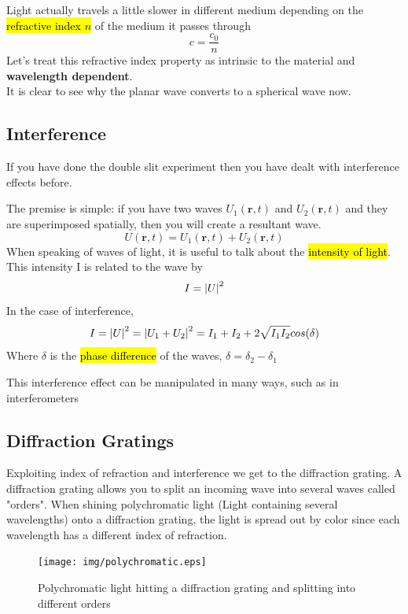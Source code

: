 \documentclass{article}
\begin{document}
Light actually travels a little slower in different medium depending on the \hl{refractive index $n$} of the medium it passes through
\begin{equation}
    c = \frac{c_0}{n}
\end{equation}
Let's treat this refractive index property as intrinsic to the material and \textbf{wavelength dependent}.
\\
It is clear to see why the planar wave converts to a spherical wave now.



\subsection{Interference}
If you have done the double slit experiment then you have dealt with interference effects before.

The premise is simple: if you have two waves $U_1(\textbf{r},t)$ and $U_2(\textbf{r},t)$ and they are superimposed spatially, then you will create a resultant wave.
\begin{equation}
    U(\textbf{r},t) = U_1(\textbf{r},t)+U_2(\textbf{r},t)
\end{equation}
When speaking of waves of light, it is useful to talk about the \hl{intensity of light}. This intensity I is related to the wave by
\begin{equation}
    I = \abs{U}^2
\end{equation}
In the case of interference,
\begin{equation}
    I = \abs{U}^2 = \abs{U_1+U_2}^2 = I_1 + I_2 + 2\sqrt{I_1 I_2}cos(\delta)
\end{equation}
Where $\delta$ is the \hl{phase difference} of the waves, $\delta = \delta_2-\delta_1$

This interference effect can be manipulated in many ways, such as in interferometers
\subsection{Diffraction Gratings}
Exploiting index of refraction and interference we get to the diffraction grating. A diffraction grating allows you to split an incoming wave into several waves called "orders". When shining polychromatic light (Light containing several wavelengths) onto a diffraction grating, the light is spread out by color since each wavelength has a different index of refraction.
\begin{figure}[!phbt]
    \centering
    \texttt{[image: img/polychromatic.eps]}
    \caption{Polychromatic light hitting a diffraction grating and splitting into different orders}
    \label{fig:polychromatic}
    \nocite{horiba}
\end{figure}
\end{document}
